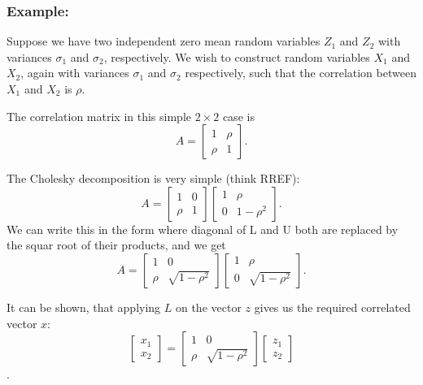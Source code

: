 \documentclass{amsart}
\theoremstyle{plain}
\numberwithin{equation}{section}
\begin{document}
\subsubsection{Example:}
Suppose we have two independent zero mean random variables 
$Z_1$ and $Z_2$ with variances $\sigma_1$ and $\sigma_2$, 
respectively. We wish to construct random variables
$X_1$ and $X_2$, again with variances $\sigma_1$ and $\sigma_2$ respectively,
such that the correlation between $X_1$ and $X_2$ is $\rho$. 

The correlation matrix in this simple $2 \times 2$ case is
\begin{equation}
A = \left[
\begin{array}{cc}
	1    & \rho\\
	\rho & 1
\end{array}
\right].
\label{}
\end{equation}

The Cholesky decomposition is very simple (think RREF):
\begin{equation}
A = \left[
\begin{array}{cc}
	1    & 0\\
	\rho & 1
\end{array}
\right]
\left[
\begin{array}{cc}
	1  & \rho\\
	0  & 1 - \rho^2
\end{array}
\right].
\label{}
\end{equation}
We can write this in the form where 
diagonal of L and U both are 
replaced by the squar root of their
products, and we get
\begin{equation}
A = \left[
\begin{array}{cc}
	1    & 0\\
	\rho & \sqrt{1-\rho^2}
\end{array}
\right]
\left[
\begin{array}{cc}
	1  & \rho\\
	0  & \sqrt{1 - \rho^2}
\end{array}
\right].
\label{}
\end{equation}

It can be shown, that applying $L$ on the vector $z$
gives us the required correlated vector $x$:
\begin{equation}
\left[
\begin{array}{c}
	  x_1 \\
		x_2 
\end{array}
\right] 
= \left[
\begin{array}{cc}
	1    & 0\\
	\rho & \sqrt{1-\rho^2}
\end{array}
\right]
\left[
\begin{array}{c}
	  z_1 \\
		z_2 
\end{array}
\right]
\label{}
\end{equation}.
\end{document}
